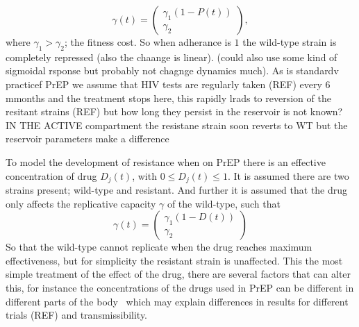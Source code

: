 \documentclass[DIV=15]{scrartcl}
\begin{document}
 \begin{equation}
\gamma (t) = \begin{pmatrix}
\gamma_1(1- P(t)) \\ \gamma_2
\end{pmatrix} , 
\label{gamma}
\end{equation}
where $\gamma_1>\gamma_2$; the fitness cost.
So when adherance is $1$ the wild-type strain is completely repressed (also the chaange is linear). (could also use some kind of sigmoidal rsponse but probably not chagnge dynamics much).  As is standardv  practicef PrEP we assume that HIV tests are regularly taken (REF) every 6 mmonths and the treatment stops here, this  rapidly  lrads to reversion of the resitant strains (REF) but how long they persist in the reservoir is not known?  IN THE ACTIVE compartment the resistane strain soon reverts to WT but the reservoir parameters make a difference 
\fi

 \iffalse
some stuff about  tenofovir resistane mutatns
\url{http://www.ncbi.nlm.nih.gov/pmc/articles/PMC3494163/}


rho is outflow -inflow no mutation low rtae in this model $ \rho = a-k/r_L$


mean generstion time in reservoir is1/a HIV

viral geneeration  is 1 day in active compartment 

\fi








To  model the development of resistance when on PrEP there is an effective concentration of drug $D_j(t)$, with $0 \leq D_j(t) \leq 1$. It is assumed there are two strains present; wild-type and resistant. And further it is assumed that the drug only affects the replicative  capacity $\gamma$ of the wild-type, such that \begin{equation*}
 \gamma(t) = \begin{pmatrix} \gamma_1(1- D(t)) \\ \gamma_2 \end{pmatrix}
\end{equation*}
So that the wild-type cannot  replicate when the drug reaches maximum effectiveness, but for simplicity the resistant strain is unaffected.
This the most simple treatment of the effect of the drug, there are several factors that can alter  this, for instance the concentrations of the drugs used in PrEP can be different in different parts of the body~\cite{patterson2011}
 which may explain differences in results for different trials (REF) and transmissibility.
\end{document}
